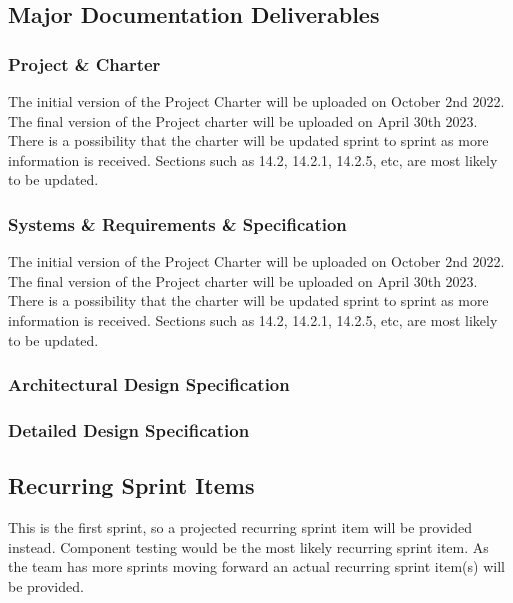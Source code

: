 
\subsection{Major Documentation Deliverables}

\subsubsection{Project \& Charter}
The initial version of the Project Charter will be uploaded on October 2nd 2022. The final version of the Project charter will be uploaded on April 30th 2023. There is a possibility that the charter will be updated sprint to sprint as more information is received. Sections such as 14.2, 14.2.1, 14.2.5, etc, are most likely to be updated.

\subsubsection{Systems \& Requirements \& Specification}	
The initial version of the Project Charter will be uploaded on October 2nd 2022. The final version of the Project charter will be uploaded on April 30th 2023. There is a possibility that the charter will be updated sprint to sprint as more information is received. Sections such as 14.2, 14.2.1, 14.2.5, etc, are most likely to be updated.

\subsubsection{Architectural Design Specification}

\subsubsection{Detailed Design Specification}

\subsection{Recurring Sprint Items}
This is the first sprint, so a projected recurring sprint item will be provided instead. Component testing would be the most likely recurring sprint item. As the team has more sprints moving forward an actual recurring sprint item(s) will be provided.


